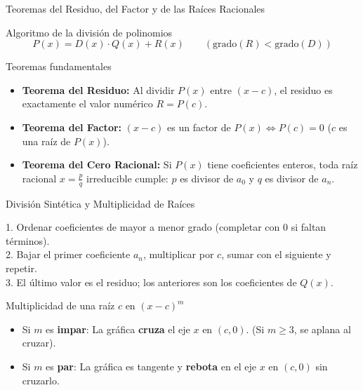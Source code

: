 \documentclass[aspectratio=169]{beamer}
\begin{document}
\begin{frame}{Teoremas del Residuo, del Factor y de las Raíces Racionales}
  \begin{block}{Algoritmo de la división de polinomios}
    $$P(x) = D(x) \cdot Q(x) + R(x) \qquad (\text{grado}(R) < \text{grado}(D))$$
  \end{block}

  \vspace{4pt}
  \begin{block}{Teoremas fundamentales}
    \begin{itemize}
      \item \textbf{Teorema del Residuo:} Al dividir $P(x)$ entre $(x - c)$, el residuo es exactamente el valor numérico $R = P(c)$.
      \item \textbf{Teorema del Factor:} $(x - c)$ es un factor de $P(x) \iff P(c) = 0$ ($c$ es una raíz de $P(x)$).
      \item \textbf{Teorema del Cero Racional:} Si $P(x)$ tiene coeficientes enteros, toda raíz racional $x = \frac{p}{q}$ irreducible cumple: $p$ es divisor de $a_0$ y $q$ es divisor de $a_n$.
    \end{itemize}
  \end{block}
\end{frame}

\begin{frame}{División Sintética y Multiplicidad de Raíces}
  \begin{mwpasos}
    1. Ordenar coeficientes de mayor a menor grado (completar con 0 si faltan términos). \\
    2. Bajar el primer coeficiente $a_n$, multiplicar por $c$, sumar con el siguiente y repetir. \\
    3. El último valor es el residuo; los anteriores son los coeficientes de $Q(x)$.
  \end{mwpasos}

  \vspace{4pt}
  \begin{alertblock}{Multiplicidad de una raíz $c$ en $(x - c)^m$}
    \begin{itemize}
      \item Si $m$ es \textbf{impar}: La gráfica \textbf{cruza} el eje $x$ en $(c, 0)$. (Si $m \ge 3$, se aplana al cruzar).
      \item Si $m$ es \textbf{par}: La gráfica es tangente y \textbf{rebota} en el eje $x$ en $(c, 0)$ sin cruzarlo.
    \end{itemize}
  \end{alertblock}
\end{frame}
\end{document}
